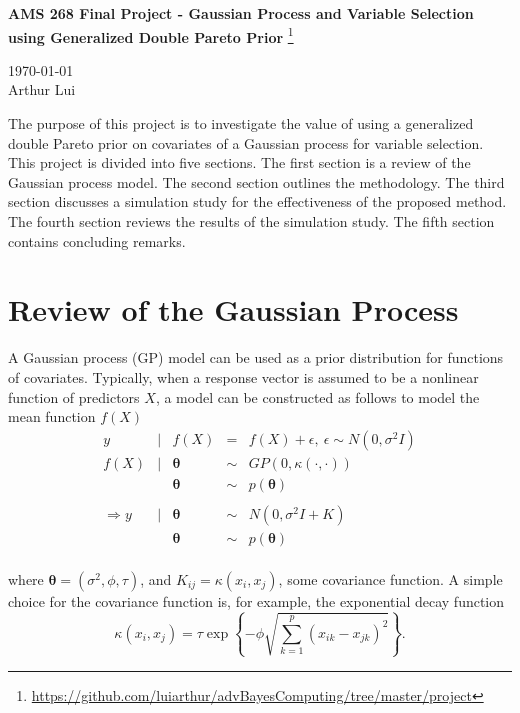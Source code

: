 \documentclass[11pt]{article}
\def\wl{\par \vspace{\baselineskip}\noindent}
\def\hline{ \textcolor{lgrey}{\hrulefill} }
\newcommand{\bc}[1]{ \left\{#1\right\} }
\begin{document}
\begin{center}
  {\huge \textbf{AMS 268 Final Project - Gaussian Process and Variable Selection using Generalized Double Pareto Prior}
    \footnote{\url{https://github.com/luiarthur/advBayesComputing/tree/master/project}}
  }\\
  \wl
  \noindent\today\\
  Arthur Lui\\
  \hline
\end{center}

The purpose of this project is to investigate the value of using a generalized
double Pareto prior on covariates of a Gaussian process for variable selection.
This project is divided into five sections. The first section is a review of
the Gaussian process model. The second section outlines the methodology. The
third section discusses a simulation study for the effectiveness of the
proposed method. The fourth section reviews the results of the simulation
study. The fifth section contains concluding remarks.


\section{Review of the Gaussian Process}
A Gaussian process (GP) model can be used as a prior distribution for functions
of covariates. Typically, when a response vector is assumed to be a nonlinear
function of predictors $X$, a model can be constructed as follows to model
the mean function $f(X)$
\[
  \begin{array}{rclcl}
    y&|&f(X) &= &f(X) + \epsilon,~\epsilon \sim N(0,\sigma^2I)\\
    f(X)&|&\bm\theta &\sim& GP(0,\kappa(\cdot,\cdot))\\
        &&\bm\theta &\sim& p(\bm\theta)\\
    \\
    \Rightarrow y&|&\bm\theta &\sim& N(0,\sigma^2I + K) \\
                 &&\bm\theta &\sim& p(\bm\theta)\\
\end{array}
\]

where $\bm\theta = (\sigma^2,\phi,\tau)$, and $K_{ij} = \kappa(x_i,x_j)$, some
covariance function. A simple choice for the covariance function is, for
example, the exponential decay function
\[
  \kappa(x_i,x_j) = \tau \exp\bc{-\phi\sqrt{\sum_{k=1}^p (x_{ik}-x_{jk})^2}}.
\]
\end{document}
